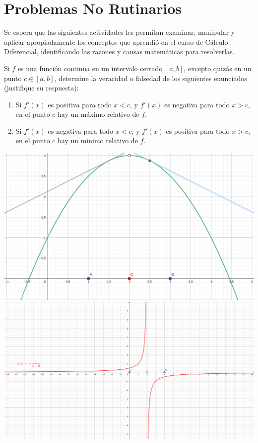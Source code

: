 \section{Problemas No Rutinarios}

Se espera que las siguientes actividades les permitan examinar, manipular y aplicar apropiadamente los conceptos que aprendió en el curso de Cálculo Diferencial, identificando las razones y causas matemáticas para resolverlas.

Si \(f\) es una función continua en un intervalo cerrado \([a, b]\), excepto quizás en un punto \(c\in[a,b]\), determine la veracidad o falsedad de los siguientes enunciados (justifique su respuesta):

\begin{enumerate}
    \item Si \(f'(x)\) es positiva para todo \(x<c\), y \(f'(x)\) es negativa para todo \(x>c\), en el punto \(c\) hay un máximo relativo de \(f\).
    \item Si \(f'(x)\) es negativa para todo \(x<c\), y \(f'(x)\) es positiva para todo \(x>c\), en el punto \(c\) hay un mínimo relativo de \(f\).
\end{enumerate}
\includegraphics[scale=0.2]{images/noRutinarios1,1.png} \\
\includegraphics[scale=0.05]{images/noRutinarios1,2.png}